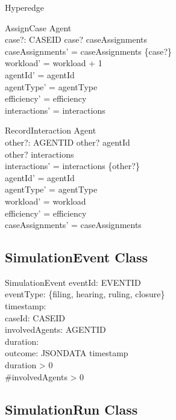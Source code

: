 \documentclass{article}
\begin{document}
\begin{class}{Hyperedge}
\begin{schema}{AssignCase}
    \Delta Agent \\
    case?: CASEID
\where
    case? \notin caseAssignments \\
    caseAssignments' = caseAssignments \cup \{case?\} \\
    workload' = workload + 1 \\
    agentId' = agentId \\
    agentType' = agentType \\
    efficiency' = efficiency \\
    interactions' = interactions
\end{schema}

\begin{schema}{RecordInteraction}
    \Delta Agent \\
    other?: AGENTID
\where
    other? \neq agentId \\
    other? \notin interactions \\
    interactions' = interactions \cup \{other?\} \\
    agentId' = agentId \\
    agentType' = agentType \\
    workload' = workload \\
    efficiency' = efficiency \\
    caseAssignments' = caseAssignments
\end{schema}

\subsection{SimulationEvent Class}

\begin{class}{SimulationEvent}
    eventId: EVENTID \\
    eventType: \{filing, hearing, ruling, closure\} \\
    timestamp: \real \\
    caseId: CASEID \\
    involvedAgents: \power AGENTID \\
    duration: \real \\
    outcome: JSONDATA
\where
    timestamp  \\
    duration > 0 \\
    \#involvedAgents > 0
\end{class}

\subsection{SimulationRun Class}


\end{class}
\end{document}
